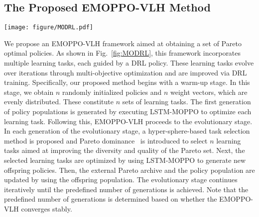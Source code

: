 \documentclass[10pt,journal,compsoc]{IEEEtran}
\begin{document}

\subsection{The Proposed EMOPPO-VLH Method}
\label{subsec:IEMORL}

\begin{figure*}[t]
    \centering
    \centerline{\texttt{[image: figure/MODRL.pdf]}}
    \caption{The algorithmic framework of EMOPPO-VLH is initiated with a warm-up stage, designed to generate a high-quality primary population. Subsequently, EMOPPO-VLH advances to the evolutionary stage, which encompasses task population update, task selection, acquisition of offspring population, and EP archive update. The tasks selected during this stage are optimized by using the LSTM-MOPPO algorithm, resulting in a new generation of offspring. The architecture of LSTM-MOPPO is represented by the part of a black dashed line in the diagram.}
    \label{fig:MODRL}
\end{figure*}

\par We propose an EMOPPO-VLH framework aimed at obtaining a set of Pareto optimal policies. As shown in Fig.~\ref{fig:MODRL}, this framework incorporates multiple learning tasks, each guided by a DRL policy. These learning tasks evolve over iterations through multi-objective optimization and are improved via DRL training. Specifically, our proposed method begins with a warm-up stage. In this stage, we obtain $n$ randomly initialized policies and $n$ weight vectors, which are evenly distributed. These constitute $n$ sets of learning tasks. The first generation of policy populations is generated by executing LSTM-MOPPO to optimize each learning task. Following this, EMOPPO-VLH proceeds to the evolutionary stage. In each generation of the evolutionary stage, a hyper-sphere-based task selection method is proposed and Pareto dominance~\cite {li2021physical} is introduced to select $n$ learning tasks aimed at improving the diversity and quality of the Pareto set. Next, the selected learning tasks are optimized by using LSTM-MOPPO to generate new offspring policies. Then, the external Pareto archive and the policy population are updated by using the offspring population. The evolutionary stage continues iteratively until the predefined number of generations is achieved. Note that the predefined number of generations is determined based on whether the EMOPPO-VLH converges stably.
\end{document}
